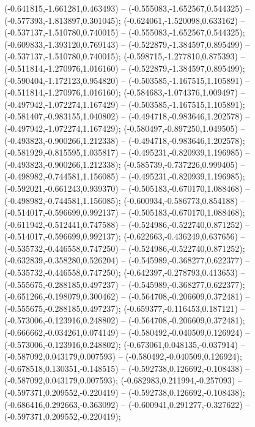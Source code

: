  (-0.641815,-1.661281,0.463493) -- (-0.555083,-1.652567,0.544325) -- (-0.577393,-1.813897,0.301045);
 (-0.624061,-1.520098,0.633162) -- (-0.537137,-1.510780,0.740015) -- (-0.555083,-1.652567,0.544325);
 (-0.609833,-1.393120,0.769143) -- (-0.522879,-1.384597,0.895499) -- (-0.537137,-1.510780,0.740015);
 (-0.598715,-1.277810,0.875393) -- (-0.511814,-1.270976,1.016160) -- (-0.522879,-1.384597,0.895499);
 (-0.590404,-1.172123,0.954820) -- (-0.503585,-1.167515,1.105891) -- (-0.511814,-1.270976,1.016160);
 (-0.584683,-1.074376,1.009497) -- (-0.497942,-1.072274,1.167429) -- (-0.503585,-1.167515,1.105891);
 (-0.581407,-0.983155,1.040802) -- (-0.494718,-0.983646,1.202578) -- (-0.497942,-1.072274,1.167429);
 (-0.580497,-0.897250,1.049505) -- (-0.493823,-0.900266,1.212338) -- (-0.494718,-0.983646,1.202578);
 (-0.581929,-0.815595,1.035817) -- (-0.495231,-0.820939,1.196985) -- (-0.493823,-0.900266,1.212338);
 (-0.585739,-0.737226,0.999405) -- (-0.498982,-0.744581,1.156085) -- (-0.495231,-0.820939,1.196985);
 (-0.592021,-0.661243,0.939370) -- (-0.505183,-0.670170,1.088468) -- (-0.498982,-0.744581,1.156085);
 (-0.600934,-0.586773,0.854188) -- (-0.514017,-0.596699,0.992137) -- (-0.505183,-0.670170,1.088468);
 (-0.611942,-0.512441,0.747588) -- (-0.524986,-0.522740,0.871252) -- (-0.514017,-0.596699,0.992137);
 (-0.622663,-0.436249,0.637656) -- (-0.535732,-0.446558,0.747250) -- (-0.524986,-0.522740,0.871252);
 (-0.632839,-0.358280,0.526204) -- (-0.545989,-0.368277,0.622377) -- (-0.535732,-0.446558,0.747250);
 (-0.642397,-0.278793,0.413653) -- (-0.555675,-0.288185,0.497237) -- (-0.545989,-0.368277,0.622377);
 (-0.651266,-0.198079,0.300462) -- (-0.564708,-0.206609,0.372481) -- (-0.555675,-0.288185,0.497237);
 (-0.659377,-0.116453,0.187121) -- (-0.573006,-0.123916,0.248802) -- (-0.564708,-0.206609,0.372481);
 (-0.666662,-0.034261,0.074149) -- (-0.580492,-0.040509,0.126924) -- (-0.573006,-0.123916,0.248802);
 (-0.673061,0.048135,-0.037914) -- (-0.587092,0.043179,0.007593) -- (-0.580492,-0.040509,0.126924);
 (-0.678518,0.130351,-0.148515) -- (-0.592738,0.126692,-0.108438) -- (-0.587092,0.043179,0.007593);
 (-0.682983,0.211994,-0.257093) -- (-0.597371,0.209552,-0.220419) -- (-0.592738,0.126692,-0.108438);
 (-0.686416,0.292663,-0.363092) -- (-0.600941,0.291277,-0.327622) -- (-0.597371,0.209552,-0.220419);
